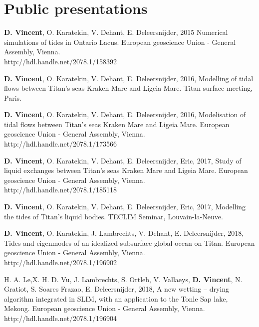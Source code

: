 \section*{Public presentations}


\begin{list}{}{%
\setlength{\topsep}{0pt}%
\setlength{\leftmargin}{0.23in}%
\setlength{\listparindent}{-0.23in}%
\setlength{\itemindent}{-0.23in}%
\setlength{\parsep}{\parskip}%
}%

\item \textbf{D. Vincent}, O. Karatekin, V. Dehant, E. Deleersnijder, 2015 Numerical simulations of tides in Ontario Lacus. European geoscience Union - General Assembly, Vienna. \\http://hdl.handle.net/2078.1/158392

\item \textbf{D. Vincent}, O. Karatekin, V. Dehant, E. Deleersnijder, 2016, Modelling of tidal flows between Titan's seas Kraken Mare and Ligeia Mare. Titan surface meeting, Paris.

\item \textbf{D. Vincent}, O. Karatekin, V. Dehant, E. Deleersnijder, 2016, Modelisation of tidal flows between Titan's seas Kraken Mare and Ligeia Mare. European geoscience Union - General Assembly, Vienna.\\
http://hdl.handle.net/2078.1/173566

\item \textbf{D. Vincent}, O. Karatekin, V. Dehant, E. Deleersnijder, Eric, 2017, Study of liquid exchanges between Titan's seas Kraken Mare and Ligeia Mare. European geoscience Union - General Assembly, Vienna. \\
http://hdl.handle.net/2078.1/185118

\item \textbf{D. Vincent}, O. Karatekin, V. Dehant, E. Deleersnijder, Eric, 2017, Modelling the tides of Titan's liquid bodies. TECLIM Seminar, Louvain-la-Neuve.

\item \textbf{D. Vincent}, O. Karatekin, J. Lambrechts, V. Dehant, E. Deleersnijder, 2018, Tides and eigenmodes of an idealized subsurface global ocean on Titan. European geoscience Union - General Assembly, Vienna. \\
http://hdl.handle.net/2078.1/196902

\item H. A. Le,X. H. D. Vu, J. Lambrechts, S. Ortleb, V. Vallaeys, \textbf{D. Vincent}, N. Gratiot, S. Soares Frazao, E. Deleersnijder, 2018, A new wetting – drying algorithm integrated in SLIM, with an application to the Tonle Sap lake, Mekong. European geoscience Union - General Assembly, Vienna.\\ http://hdl.handle.net/2078.1/196904







\end{list}
